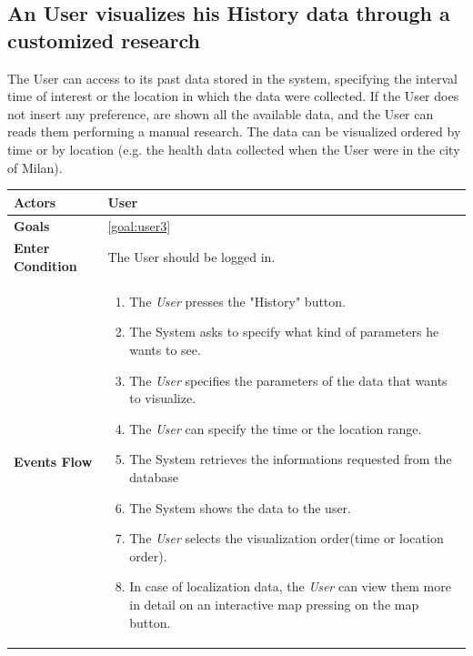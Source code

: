  \subsection{An User visualizes his History data through a customized research}
 
The User can access to its past data stored in the system, specifying the interval time of interest or the location in which the data were collected. If the User does not insert any preference, are shown all the available data, and the User can reads them performing a manual research.
The data can be visualized ordered by time or by location (e.g. the health data collected when the User were in the city of Milan).

\begin{table}[H]
	\centering
    
    \begin{tabular}{|p{3.5cm}|p{10.3cm}|}
    
    \hline
    
    \textbf{\large{Actors}}  			& \tabitem  User  				\\
    				 	
    \hline
    
    \textbf{\large{Goals}} 				&\ref{goal:user3}\\
    
     \hline
     
    \textbf{\large{Enter Condition}} & The User should be logged in.\\
    
    \hline
    \textbf{\large{Events Flow}}		& \begin{enumerate}[leftmargin=0.5cm]
                                          	\item The \emph{User}  presses the "History" button.
                                            \item The System asks to specify what kind of parameters he wants to see.
                                            \item The \emph{User} specifies the parameters of the data that wants to visualize.
                                            \item The \emph{User} can specify the time or the location range. 
                                            \item The System retrieves the informations requested from the database
                                            \item The System shows the data to the user.
                                            \item The \emph{User} selects the visualization order(time or location order).
                                            \item In case of localization data, the \emph{User} can view them more in detail on an interactive map pressing on the map button.            \end{enumerate}\\
                                            

\end{tabular}
\end{table}

